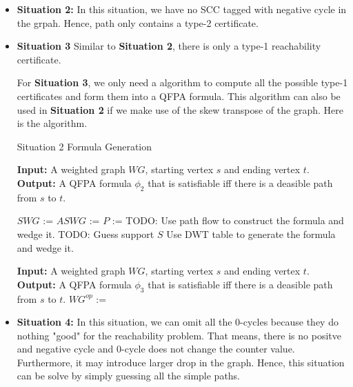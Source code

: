 \documentclass[12pt]{article}
\begin{document}
\begin{itemize}
\item \textbf{Situation 2:}
In this situation, we have no SCC tagged with negative cycle in the grpah. Hence, path only contains a type-2 certificate.

\item \textbf{Situation 3}
Similar to \textbf{Situation 2}, there is only a type-1 reachability certificate.

For \textbf{Situation 3}, we only need a algorithm to compute all the possible type-1 certificates and form them into a QFPA formula. This algorithm can also be used in \textbf{Situation 2} if we make use of the skew transpose of the graph.
Here is the algorithm.
\begin{algorithm}
	\caption{Situation 2 Formula Generation}
	\begin{algorithmic}
		\State {}
			\State \textbf{Input:} A weighted graph $WG$, starting vertex $s$ and ending vertex $t$.
			\State \textbf{Output:} A QFPA formula $\phi_2$ that is satisfiable iff there is a deasible path from $s$ to $t$.
			
			\State $SWG$ := 
			\State $ASWG$ := 
			\State $P$ := 
						\State TODO:
						\State Use path flow to construct the formula and wedge it.
					\Else
						\State TODO:
						\State Guess support $S$
						\State {}
						\State Use DWT table to generate the formula and wedge it.
					\EndIf
				\EndFor
				
			\EndFor
		\EndFunction
		
		\State {}
			\State \textbf{Input:} A weighted graph $WG$, starting vertex $s$ and ending vertex $t$.
			\State \textbf{Output:} A QFPA formula $\phi_3$ that is satisfiable iff there is a deasible path from $s$ to $t$.
			\State $WG^{op}$ := 
			\State \Return {}
		\EndFunction
	\end{algorithmic}
\end{algorithm}

\item \textbf{Situation 4:}
In this situation, we can omit all the 0-cycles because they do nothing "good" for the reachability problem. That means, there is no positve and negative cycle and 0-cycle does not change the counter value. Furthermore, it may introduce larger drop in the graph. Hence, this situation can be solve by simply guessing all the simple paths.

\end{itemize}
\end{document}
